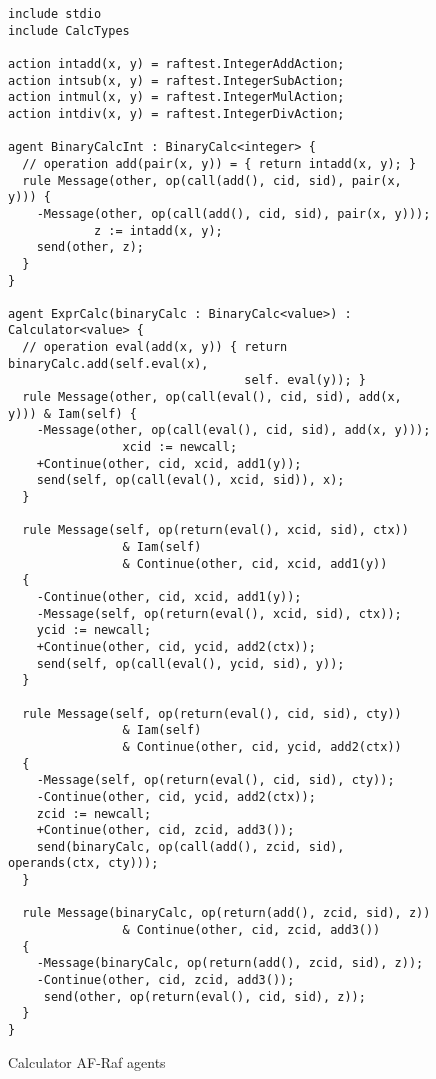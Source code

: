 \documentclass[a4paper,12pt,oneside,fleqn]{book} %
\theoremstyle{plain}
\theoremstyle{definition}
\theoremstyle{remark}
\begin{document}
\begin{figure}\footnotesize %
\begin{verbatim}
include stdio
include CalcTypes

action intadd(x, y) = raftest.IntegerAddAction;
action intsub(x, y) = raftest.IntegerSubAction;
action intmul(x, y) = raftest.IntegerMulAction;
action intdiv(x, y) = raftest.IntegerDivAction;

agent BinaryCalcInt : BinaryCalc<integer> {
  // operation add(pair(x, y)) = { return intadd(x, y); }
  rule Message(other, op(call(add(), cid, sid), pair(x, y))) {
    -Message(other, op(call(add(), cid, sid), pair(x, y)));
            z := intadd(x, y);
    send(other, z);
  }
}

agent ExprCalc(binaryCalc : BinaryCalc<value>) : Calculator<value> {
  // operation eval(add(x, y)) { return binaryCalc.add(self.eval(x), 
                                 self. eval(y)); }
  rule Message(other, op(call(eval(), cid, sid), add(x, y))) & Iam(self) {
    -Message(other, op(call(eval(), cid, sid), add(x, y)));
                xcid := newcall;
    +Continue(other, cid, xcid, add1(y));
    send(self, op(call(eval(), xcid, sid)), x);
  }
        
  rule Message(self, op(return(eval(), xcid, sid), ctx)) 
                & Iam(self) 
                & Continue(other, cid, xcid, add1(y)) 
  {
    -Continue(other, cid, xcid, add1(y));
    -Message(self, op(return(eval(), xcid, sid), ctx));
    ycid := newcall;
    +Continue(other, cid, ycid, add2(ctx));
    send(self, op(call(eval(), ycid, sid), y));
  }
        
  rule Message(self, op(return(eval(), cid, sid), cty))
                & Iam(self)
                & Continue(other, cid, ycid, add2(ctx))
  {
    -Message(self, op(return(eval(), cid, sid), cty));
    -Continue(other, cid, ycid, add2(ctx));
    zcid := newcall;
    +Continue(other, cid, zcid, add3());
    send(binaryCalc, op(call(add(), zcid, sid), operands(ctx, cty)));
  }
        
  rule Message(binaryCalc, op(return(add(), zcid, sid), z))
                & Continue(other, cid, zcid, add3())
  {
    -Message(binaryCalc, op(return(add(), zcid, sid), z));
    -Continue(other, cid, zcid, add3());
     send(other, op(return(eval(), cid, sid), z));
  }
}

\end{verbatim}
\caption{Calculator AF-Raf agents}
\label{fig:calc-rules}
\end{figure} %
\end{document}
